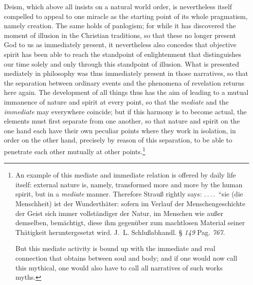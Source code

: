 \documentclass[12pt]{book}
\newcommand{\opage}[1]{\marginnote{\footnotesize\textit{[#1]}}}
\begin{document}
Deism, which above all insists on a natural world order, is nevertheless itself
compelled to appeal to one miracle as the starting point of its whole pragmatism,
namely creation. The same holds of panlogism; for while it has discovered the
moment of illusion in the Christian
\opage{151} \setcounter{footnote}{0}%
traditions, so that these no longer present God to us as immediately present, it
nevertheless also concedes that objective spirit has been able to reach the
standpoint of enlightenment that distinguishes our time solely and only through
this standpoint of illusion. What is presented mediately in philosophy was thus
immediately present in those narratives, so that the separation between ordinary
events and the phenomena of revelation returns here again. The development of
all things thus has the aim of leading to a mutual immanence of nature and spirit
at every point, so that the \emph{mediate} and the \emph{immediate} may
everywhere coincide; but if this harmony is to become actual, the elements must
first separate from one another, so that nature and spirit on the one hand each
have their own peculiar points where they work in isolation, in order on the
other hand, precisely by reason of this separation, to be able to penetrate each
other mutually at other points.\footnote{An example of this mediate and
immediate relation is offered by daily life itself: external nature is, namely,
transformed more and more by the human spirit, but in a \emph{mediate} manner.
Therefore Strauß rightly says: .\,.\,.\,.\ ``sie (die Menschheit) ist der
Wunderthäter: sofern im Verlauf der Menschengeschichte der Geist sich immer
vollständiger der Natur, im Menschen wie außer demselben, bemächtigt, diese ihm
gegenüber zum machtlosen Material seiner Thätigkeit heruntergesetzt wird. J.~L.
Schlußabhandl. § \textit{149} Pag. \textit{767}.

But this mediate activity is bound up with the immediate and real connection that
obtains between soul and body; and if one would now call this mythical, one would
also have to call all narratives of such works myths.}
\end{document}
